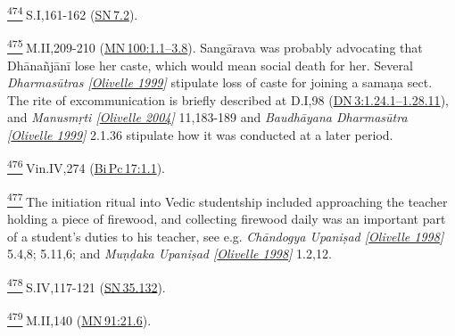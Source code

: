 \label{footprints_split_025.html_fn474}
\hyperref[footprints_split_013.htmlux5cux23fnref474]{\textsuperscript{474}} S.I,161-162
(\href{https://suttacentral.net/sn7.2/en/sujato}{SN\,7.2}).

\label{footprints_split_025.html_fn475}
\hyperref[footprints_split_013.htmlux5cux23fnref475]{\textsuperscript{475}} M.II,209-210
(\href{https://suttacentral.net/mn100/en/sujato\#1.1}{MN\,100:1.1--3.8}).
Sangārava was probably advocating that Dhānañjānī lose her caste, which
would mean social death for her. Several \emph{{Dharmasūtras
{{[}\hyperref[footprints_split_022.htmlux5cux23Olivelleux5cux25201999]{Olivelle
1999}{]}}}} stipulate loss of caste for joining a samaṇa sect. The rite
of excommunication is briefly described at D.I,98
(\href{https://suttacentral.net/dn3/en/sujato\#1.24.1}{DN\,3:1.24.1--1.28.11}),
and \emph{{Manusmṛti
{{[}\hyperref[footprints_split_022.htmlux5cux23Olivelleux5cux25202004]{Olivelle
2004}{]}}}} 11,183-189 and \emph{{Baudhāyana Dharmasūtra
{{[}\hyperref[footprints_split_022.htmlux5cux23Olivelleux5cux25201999]{Olivelle
1999}{]}}}} 2.1.36 stipulate how it was conducted at a later period.

\label{footprints_split_025.html_fn476}
\hyperref[footprints_split_013.htmlux5cux23fnref476]{\textsuperscript{476}} Vin.IV,274
(\href{https://suttacentral.net/pli-tv-bi-vb-pc17/en/brahmali\#1.1}{Bi\,Pc\,17:1.1}).

\label{footprints_split_025.html_fn477}
\hyperref[footprints_split_013.htmlux5cux23fnref477]{\textsuperscript{477}} The
initiation ritual into Vedic studentship included approaching the
teacher holding a piece of firewood, and collecting firewood daily was
an important part of a student's duties to his teacher, see e.g.
\emph{{Chāndogya Upaniṣad
{{[}\hyperref[footprints_split_022.htmlux5cux23Olivelleux5cux25201998]{Olivelle
1998}{]}}}} 5.4,8; 5.11,6; and \emph{{Muṇḍaka Upaniṣad
{{[}\hyperref[footprints_split_022.htmlux5cux23Olivelleux5cux25201998]{Olivelle
1998}{]}}}} 1.2,12.

\label{footprints_split_025.html_fn478}
\hyperref[footprints_split_013.htmlux5cux23fnref478]{\textsuperscript{478}} S.IV,117-121
(\href{https://suttacentral.net/sn35.132/en/sujato}{SN\,35.132}).

\label{footprints_split_025.html_fn479}
\hyperref[footprints_split_013.htmlux5cux23fnref479]{\textsuperscript{479}} M.II,140
(\href{https://suttacentral.net/mn91/en/sujato\#21.6}{MN\,91:21.6}).

